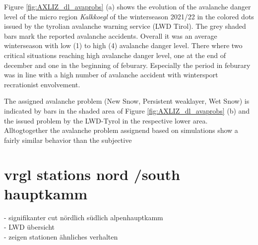 \noindent Figure \ref{fig:AXLIZ_dl_avaprobs} (a) shows the evolution of the avalanche danger level
of the micro region \textit{Kalkkoegl} of the winterseason 2021/22 in the colored dots issued by 
the tyrolian avalanche warning service (LWD Tirol). The grey shaded bars mark the reported avalanche 
accidents. Overall it was an average winterseason with low (1) to high (4) avalanche danger level. 
There where two critical situations reaching high avalanche danger level, one at the end of december 
and one in the beginning of feburary. Especially the period in feburary was in line
with a high number of avalanche accident with wintersport recrationist envolvement. 

\noindent The assigned avalanche problem (New Snow, Persistent weaklayer, Wet Snow) is indicated by bars in the 
shaded area of Figure \ref{fig:AXLIZ_dl_avaprobs} (b) and the issued problem by the LWD-Tyrol in the 
respective lower area. 
\\
Alltogtogether the avalanche problem assignend based on simulations show a fairly similar
behavior than the subjective



\section{ vrgl stations nord /south hauptkamm}

- signifikanter cut nördlich südlich alpenhauptkamm\\
- LWD übersicht\\
- zeigen stationen ähnliches verhalten
